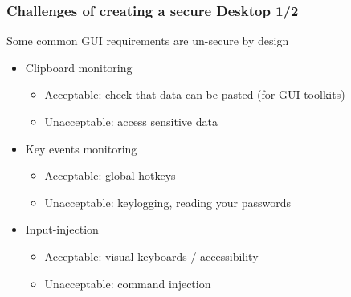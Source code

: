 \begin{frame}
\frametitle{Challenges of creating a secure Desktop 1/2}

	\begin{block}{Some common GUI requirements are un-secure by design}
		\begin{itemize}
			\item Clipboard monitoring
			\begin{itemize}
				\item Acceptable: check that data can be pasted (for GUI toolkits)
				\item Unacceptable: access sensitive data
			\end{itemize}
			\item Key events monitoring
			\begin{itemize}
				\item Acceptable: global hotkeys
				\item Unacceptable: keylogging, reading your passwords
			\end{itemize}
			\item Input-injection
			\begin{itemize}
				\item Acceptable: visual keyboards / accessibility
				\item Unacceptable: command injection
			\end{itemize}
		\end{itemize}
	\end{block}


\end{frame}

